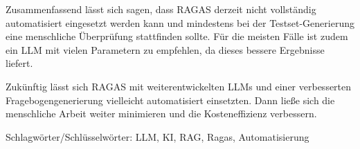 Zusammenfassend lässt sich sagen, dass RAGAS derzeit nicht vollständig automatisiert eingesetzt werden kann und mindestens bei der Testset-Generierung eine menschliche Überprüfung stattfinden sollte.
Für die meisten Fälle ist zudem ein LLM mit vielen Parametern zu empfehlen, da dieses bessere Ergebnisse liefert.

Zukünftig lässt sich RAGAS mit weiterentwickelten LLMs und einer verbesserten Fragebogengenerierung vielleicht automatisiert einsetzten.
Dann ließe sich die menschliche Arbeit weiter minimieren und die Kosteneffizienz verbessern.




Schlagwörter/Schlüsselwörter:
LLM, KI, RAG, Ragas, Automatisierung